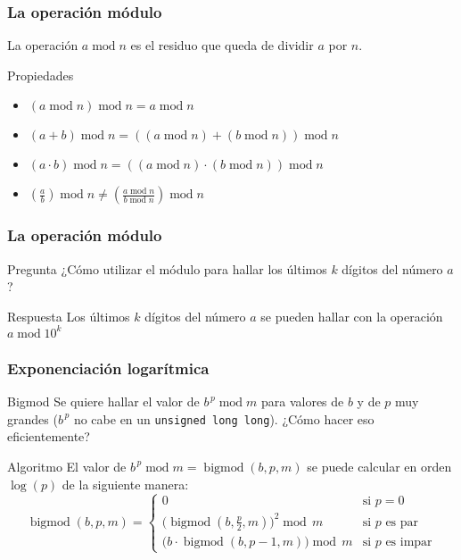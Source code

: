 \documentclass{beamer}
\begin{document}
	\begin{frame}
		\frametitle{La operación módulo}
		La operación $a \operatorname{mod} n$ es el residuo que queda de dividir $a$ por $n$.
		\begin{block}{Propiedades}
			\begin{itemize}
				\item $(a \operatorname{mod} n) \operatorname{mod} n = a \operatorname{mod} n$
				\item $(a + b) \operatorname{mod} n = ((a \operatorname{mod} n) + (b\operatorname{mod} n)) \operatorname{mod} n$
				\item $(a \cdot b) \operatorname{mod} n = ((a \operatorname{mod} n) \cdot (b\operatorname{mod} n)) \operatorname{mod} n$
				\item $\displaystyle\left(\frac{a}{b} \right) \operatorname{mod} n \neq \left(\frac{a \operatorname{mod} n}{b\operatorname{mod} n}\right) \operatorname{mod} n$
			\end{itemize}
		\end{block}
	\end{frame}
	
	\begin{frame}
		\frametitle{La operación módulo}
		\begin{alertblock}{Pregunta}
			¿Cómo utilizar el módulo para hallar los últimos $k$ dígitos del número $a$?
		\end{alertblock}
		\pause
		\begin{exampleblock}{Respuesta}
			Los últimos $k$ dígitos del número $a$ se pueden hallar con la operación $a \operatorname{mod} 10^k$
		\end{exampleblock}
	\end{frame}

	\begin{frame}[fragile]
		\frametitle{Exponenciación logarítmica}
		\begin{alertblock}{Bigmod}
			Se quiere hallar el valor de $b^{\,p} \operatorname{mod} m$ para valores de $b$ y de $p$ muy grandes ($b^{\,p}$ no cabe en un \verb|unsigned long long|).
			¿Cómo hacer eso eficientemente?
		\end{alertblock}
		\pause
		\begin{exampleblock}{Algoritmo}
			El valor de $b^{\,p} \operatorname{mod} m = \operatorname{bigmod}(b, p, m)$ se puede calcular en orden $\operatorname{log}(p)$ de la siguiente manera:
			$$ \operatorname{bigmod}(b, p, m) =
			\begin{cases}
				0    & \text{si } p = 0\\
				\big(\operatorname{bigmod}(b, \frac{p}{2}, m)\big)^2 \operatorname{mod} \,m &  \text{si } p \text{ es par}\\
				\big(b \cdot \operatorname{bigmod}(b, p-1, m)\big)   \operatorname{mod} \,m &  \text{si } p \text{ es impar}
			\end{cases}$$
		\end{exampleblock}
	\end{frame}
\end{document}
